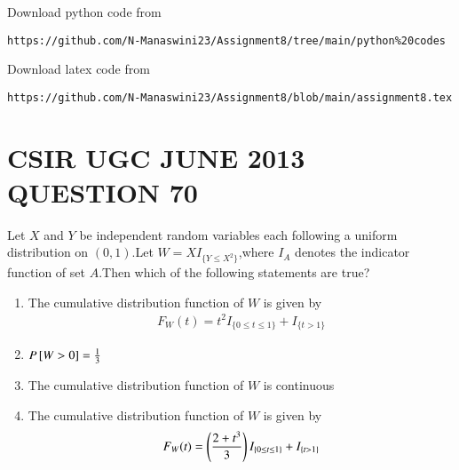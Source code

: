 \documentclass[journal,12pt,twocolumn]{IEEEtran}
\begin{document}
\renewcommand{\thefigure}{\theenumi}
\renewcommand{\thetable}{\theenumi}
Download python code from 
\begin{lstlisting}
https://github.com/N-Manaswini23/Assignment8/tree/main/python%20codes
\end{lstlisting}
%
Download latex code from 
\begin{lstlisting}
https://github.com/N-Manaswini23/Assignment8/blob/main/assignment8.tex
\end{lstlisting}
%

\section*{CSIR UGC JUNE 2013 QUESTION 70}
Let $X$ and $Y$ be independent random variables each following a uniform distribution on $(0,1)$.Let $W=XI_{\{Y\leq X^2\}}$,where $I_A$ denotes the indicator function of set $A$.Then which of the following statements are true? \\
\begin{enumerate}
\item The cumulative distribution function of $W$ is given by
\begin{align}
  F_W(t)=t^2I_{\{0\leq t \leq 1\}}+ I_{\{t > 1\}}
\end{align}
\item $P{}\left[W>0\right]=\frac{1}{3}$
\item The cumulative distribution function of $W$ is continuous
\item The cumulative distribution function of $W$ is given by
\begin{align}
  F_W(t)=\left(\frac{2+t^3}{3}\right)I_{\{0\leq t \leq 1\}}+ I_{\{t > 1\}}
\end{align}
\end{enumerate}
\end{document}
